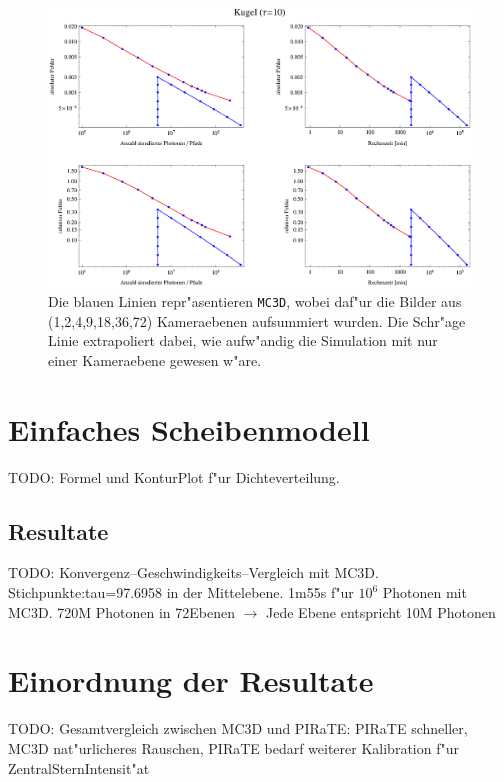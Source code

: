 		\begin{figure}
			\centering
			\includegraphics[angle=90,height=1.0\textheight]{sphere3errorplot.eps}
			\caption{Die blauen Linien repr"asentieren \texttt{MC3D}, wobei daf"ur die Bilder aus (1,2,4,9,18,36,72) Kameraebenen aufsummiert wurden. Die Schr"age Linie extrapoliert dabei, wie aufw"andig die Simulation mit nur einer Kameraebene gewesen w"are.}
			\label{fig:sphere3_error}
		\end{figure}
	
	\section{Einfaches Scheibenmodell}
	TODO: Formel und KonturPlot f"ur Dichteverteilung.
	\subsection{Resultate}
	TODO: Konvergenz--Geschwindigkeits--Vergleich mit MC3D.
	Stichpunkte:tau=97.6958 in der Mittelebene. 1m55s f"ur $10^6$ Photonen mit MC3D. 720M Photonen in 72Ebenen $\rightarrow$ Jede Ebene entspricht 10M Photonen
	\section{Einordnung der Resultate}
	TODO: Gesamtvergleich zwischen MC3D und PIRaTE: PIRaTE schneller, MC3D nat"urlicheres Rauschen, PIRaTE bedarf weiterer Kalibration f"ur ZentralSternIntensit"at